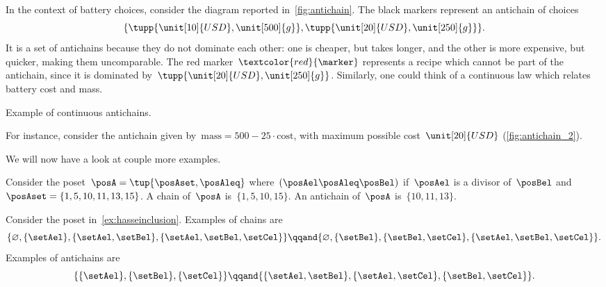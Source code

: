In the context of battery choices, consider the diagram reported in~\cref{fig:antichain}.
The black markers represent an antichain of choices
\begin{equation}
    \{
        \tupp{\unit[10]{USD},\unit[500]{g}},
        \tupp{\unit[20]{USD},\unit[250]{g}}
    \}.
\end{equation}
It is a set of antichains because they do not dominate each other: one is cheaper, but takes longer, and the other is more expensive, but quicker, making them uncomparable.
The red marker~$\textcolor{red}{\marker}$ represents a recipe which cannot be part of the antichain, since it is dominated by~$\tupp{\unit[20]{USD},\unit[250]{g}}$.
Similarly, one could think of a continuous law which relates battery cost and mass.
%
\begin{marginfigure}
    \centering
    \caption{Example of continuous antichains.}
    \label{fig:antichain_2}
\end{marginfigure}
%
For instance, consider the antichain given by~$\text{mass}=500-25\cdot \text{cost}$, with maximum possible cost~$\unit[20]{USD}$ (\cref{fig:antichain_2}).

We will now have a look at couple more examples.
\begin{example}
    Consider the poset~$\posA=\tup{\posAset,\posAleq}$ where~$(\posAel \posAleq \posBel)$ if~$\posAel$ is a divisor of~$\posBel$ and~$\posAset=\{1,5,10,11,13,15\}$.
    A chain of~$\posA$ is~$\{1,5,10,15\}$.
    An antichain of~$\posA$ is~$\{10,11,13\}$.
\end{example}

\begin{example}
    Consider the poset in~\cref{ex:hasseinclusion}.
    Examples of chains are
    \begin{equation}
        \{\varnothing,\{\setAel\},\{\setAel,\setBel\},\{\setAel,\setBel,\setCel\}\}
        \qqand
        \{\varnothing,\{\setBel\},\{\setBel,\setCel\},\{\setAel,\setBel,\setCel\}\}.
    \end{equation}
    Examples of antichains are
    \begin{equation}
        \{\{\setAel\},\{\setBel\},\{\setCel\}\}
        \qqand
        \{ \{\setAel,\setBel\},\{\setAel,\setCel\}, \{\setBel,\setCel\}\}.
    \end{equation}
\end{example}
